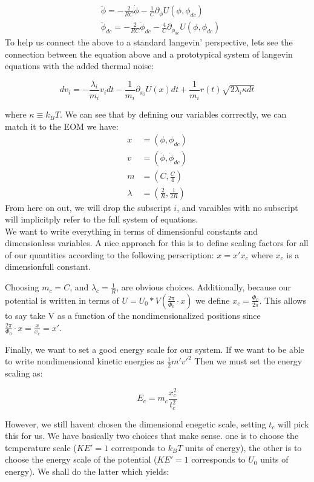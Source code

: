 \documentclass[paper=a4, twocolumn, fontsize=10pt]{article} %
\numberwithin{equation}{section} %
\numberwithin{figure}{section} %
\numberwithin{table}{section} %
\begin{document}
\begin{align}
    &\ddot{\phi} = -\frac{2}{RC} \dot{\phi} -\frac{1}{C} \partial_\phi U(\phi, \phi_{dc})
    \\
    &\ddot{\phi}_{dc} = -\frac{2}{RC} \dot{\phi}_{dc} - \frac{4}{C}\partial_{\phi_{dc}} U(\phi, \phi_{dc})
    \end{align}
To help us connect the above to a standard langevin' perspective, lets see the connection between the equation above and a prototypical system of langevin equations with the added thermal noise:

\[ dv_i = -\frac{\lambda_i}{m_i} v_i dt - \frac{1}{m_i} \partial_{x_i} U(x) dt + \frac{1}{m_i} r(t)\sqrt{2\lambda_i \kappa dt} \]

where $\kappa\equiv k_B T$. We can see that by defining our variables corrrectly, we can match it to the EOM we have:
\begin{align*}
x &=  (\phi, \phi_{dc}) \\
v &= (\dot{\phi}, \dot{\phi}_{dc}) \\
m &= ( C, \frac{C}{4}) \\
\lambda &= (\frac{2}{R}, \frac{1}{2R})
\end{align*}
From here on out, we will drop the subscript $i$, and varaibles with no subscript will implicitply refer to the full system of equations.\\

We want to write everything in terms of dimensionful constants and dimensionless variables. A nice approach for this is to define scaling factors for all of our quantities according to the following perscription: $ x = x' x_c$ where $x_c$ is a dimensionfull constant.

Choosing $m_c = C $, and $\lambda_c = \frac{1}{R}$, are obvious choices. Additionally, because our potential is written in terms of $U = U_0 * V(\frac{2\pi}{\Phi_0} \cdot x) $ we define $x_c = \frac{\Phi_0}{2\pi}$. This allows to say take V as a function of the nondimensionalized positions since $\frac{2\pi}{\Phi_0} \cdot x = \frac{x}{x_c} = x' $.


Finally, we want to set a good energy scale for our system. If we want to be able to write nondimensional kinetic energies as $\frac{1}{2} m' v'^2$ Then we must set the energy scaling as:

\[ E_c  = m_c \frac{ x^2_c}{t^2_c} \]

However, we still havent chosen the dimensional enegetic scale, setting $t_c$ will pick this for us. We have basically two choices that make sense. one is to choose the temperature scale ($KE'=1$ corresponds to $k_B T$ units of energy), the other is to choose the energy scale of the potential ($KE'=1$ corresponds to $U_0$ units of energy). We shall do the latter which yields:
\end{document}
